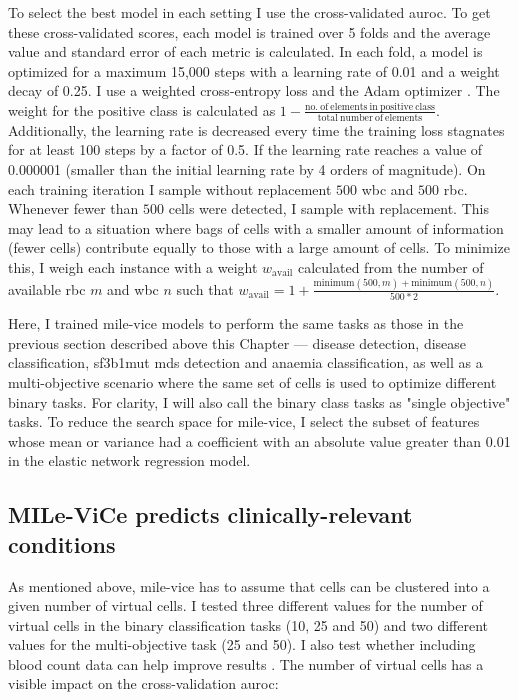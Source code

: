 To select the best model in each setting I use the cross-validated \ac{auroc}. To get these cross-validated scores, each model is trained over 5 folds and the average value and standard error of each metric is calculated. In each fold, a model is optimized for a maximum 15,000 steps with a learning rate of 0.01 and a weight decay of 0.25. I use a weighted cross-entropy loss and the Adam optimizer \cite{Kingma2014-zd}. The weight for the positive class is calculated as $1 - \frac{\mathrm{no.\ of\ elements\ in\ positive\ class}}{\mathrm{total\ number\ of\ elements}}$. Additionally, the learning rate is decreased every time the training loss stagnates for at least 100 steps by a factor of 0.5. If the learning rate reaches a value of 0.000001 (smaller than the initial learning rate by 4 orders of magnitude). On each training iteration I sample without replacement $500$ \ac{wbc} and $500$ \ac{rbc}. Whenever fewer than $500$ cells were detected, I sample with replacement. This may lead to a situation where bags of cells with a smaller amount of information (fewer cells) contribute equally to those with a large amount of cells. To minimize this, I weigh each instance with a weight $w_{\mathrm{avail}}$ calculated from the number of available \ac{rbc} $m$ and \ac{wbc} $n$ such that $w_{\mathrm{avail}} = 1 + \frac{\mathrm{minimum}(500,m) + \mathrm{minimum}(500,n)}{500*2}$.

Here, I trained \ac{mile-vice} models to perform the same tasks as those in the previous section described above this Chapter ---  disease detection, disease classification, \ac{sf3b1}mut \ac{mds} detection and anaemia classification, as well as a multi-objective scenario where the same set of cells is used to optimize different binary tasks. For clarity, I will also call the binary class tasks as "single objective" tasks. To reduce the search space for \ac{mile-vice}, I select the subset of features whose mean or variance had a coefficient with an absolute value greater than 0.01 in the elastic network regression model.

\subsection{MILe-ViCe predicts clinically-relevant conditions}

As mentioned above, \ac{mile-vice} has to assume that cells can be clustered into a given number of virtual cells. I tested three different values for the number of virtual cells in the binary classification tasks (10, 25 and 50) and two different values for the multi-objective task (25 and 50). I also test whether including blood count data can help improve results . The number of virtual cells has a visible impact on the cross-validation \ac{auroc}:


